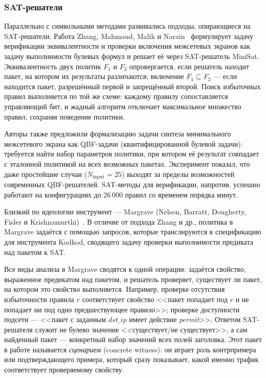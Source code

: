 \subsubsection{SAT-решатели}
\label{sec:Section2:smt}

Параллельно с символьными методами развивались подходы, опирающиеся на SAT-решатели. Работа Zhang, Mahmoud, Malik и Narain~\cite{zhang2012verification} формулирует задачу верификации эквивалентности и проверки включения межсетевых экранов как задачу выполнимости булевых формул и решает её через SAT-решатель MiniSat. Эквивалентность двух политик $F_1$ и $F_2$ опровергается, если решатель находит пакет, на котором их результаты различаются; включение $F_1 \subseteq F_2$ --- если находится пакет, разрешённый первой и запрещённый второй. Поиск избыточных правил выполняется по той же схеме: каждому правилу сопоставляется управляющий бит, и жадный алгоритм отключает максимальное множество правил, сохраняя поведение политики.

Авторы также предложили формализацию задачи синтеза минимального межсетевого экрана как QBF-задачи (квантифицированной булевой задачи): требуется найти набор параметров политики, при котором её результат совпадает с эталонной политикой на всех возможных пакетах. Эксперимент показал, что даже простейшие случаи ($N_{\text{input}} = 25$) выходят за пределы возможностей современных QBF-решателей. SAT-методы для верификации, напротив, успешно работают на конфигурациях до 26\,000 правил со временем порядка минут.

Близкий по идеологии инструмент --- Margrave (Nelson, Barratt, Dougherty, Fisler и Krishnamurthi)~\cite{nelson2010margrave}. В отличие от подхода Zhang и др., политика в Margrave задаётся с помощью запросов, которые транслируются в спецификацию для инструмента Kodkod, сводящего задачу проверки выполнимости предиката над пакетом к SAT.

Все виды анализа в Margrave сводятся к одной операции: задаётся свойство, выраженное предикатом над пакетом, и решатель проверяет, существует ли пакет, на котором это свойство выполняется. Например, проверке отсутствия избыточности правила $r$ соответствует свойство <<пакет попадает под $r$ и не попадает ни под одно предшествующее правило>>; проверке доступности подсети --- <<пакет с заданным $\textit{dst\_ip}$ имеет действие \textit{permit}>>. Ответом SAT-решателя служит не булево значение <<существует/не существует>>, а сам найденный пакет --- конкретный набор значений всех полей заголовка. Этот пакет в работе называется \emph{сценарием} (concrete witness): он играет роль контрпримера или подтверждающего примера, который сразу показывает, какой именно трафик соответствует проверяемому свойству.

